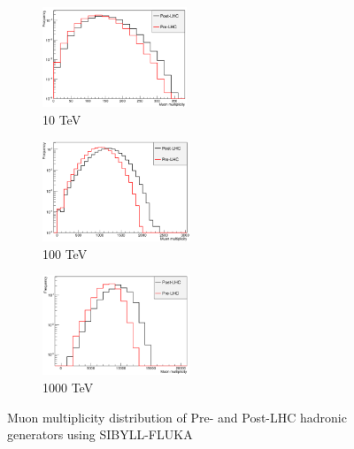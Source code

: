 \documentclass[12pt]{article}
\begin{document}
\begin{figure}
\begin{subfigure}{0.32\textwidth}
\includegraphics[width=0.9\linewidth, height=3cm]{sibyll-lhc-mm10} 
\caption{10 TeV}
\label{fig:sibyll-lhc-mm10}
\end{subfigure}
\begin{subfigure}{0.32\textwidth}
\includegraphics[width=0.9\linewidth, height=3cm]{sibyll-lhc-mm100} 
\caption{100 TeV}
\label{fig:sibyll-lhc-mm100}
\end{subfigure}
\begin{subfigure}{0.32\textwidth}
\includegraphics[width=0.9\linewidth, height = 3cm]{sibyll-lhc-mm1000} 
\caption{1000 TeV}
\label{fig:sibyll-lhc-mm1000}
\end{subfigure}
\caption{Muon multiplicity distribution of Pre- and Post-LHC hadronic generators using SIBYLL-FLUKA}
\label{fig:lhc_multiplicity_sibyll}
\end{figure}
\end{document}
